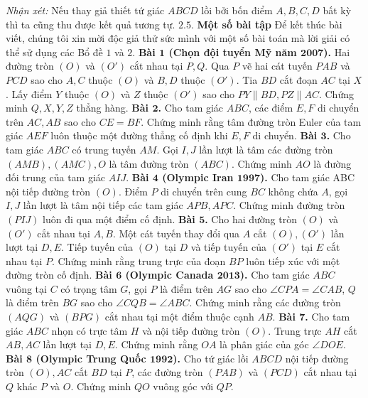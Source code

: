 \begin{multicols}{2}
\begin{figure}[H]
		\vspace*{-10pt}
	\end{figure}
	\textit{Nhận xét:} Nếu thay giả thiết tứ giác $ABCD$ lồi bởi bốn điểm $A,B,C,D$ bất kỳ thì ta cũng thu được kết quả tương tự.
	\vskip 0.1cm
	$\pmb{2.5.}$ \textbf{\color{hoccungpi}Một số bài tập}
	\vskip 0.1cm
	Để kết thúc bài viết, chúng tôi xin mời độc giả thử sức mình với một số bài toán mà lời giải có thể sử dụng các Bổ đề $1$ và $2$.
	\vskip 0.1cm
	\textbf{\color{hoccungpi}Bài $\pmb{1}$ (Chọn đội tuyển Mỹ năm $\pmb{2007}$).} Hai đường tròn $(O)$ và $(O')$ cắt nhau tại $P,Q$.  Qua $P$ vẽ hai cát tuyến $PAB$ và $PCD$ sao cho $A,C$ thuộc $(O)$ và $B,D$ thuộc $(O')$. Tia $BD$ cắt đoạn $AC$ tại $X$. Lấy điểm $Y$ thuộc $(O)$ và $Z$ thuộc $(O')$ sao cho $PY\parallel BD,PZ\parallel AC$. Chứng minh $Q,X,Y,Z$ thẳng hàng.
	\vskip 0.1cm
	\textbf{\color{hoccungpi}Bài $\pmb{2}$.} Cho tam giác $ABC$, các điểm $E,F$ di chuyển trên $AC,AB$ sao cho $CE=BF$. Chứng minh rằng tâm đường tròn Euler của tam giác $AEF$ luôn thuộc một đường thẳng cố định khi $E,F$ di chuyển.
	\vskip 0.1cm
	\textbf{\color{hoccungpi}Bài $\pmb{3}$.} Cho tam giác $ABC$ có trung tuyến $AM$. Gọi $I,J$ lần lượt là tâm các đường tròn $(AMB),(AMC),O$ là tâm đường tròn $(ABC)$. Chứng minh $AO$ là đường đối trung của tam giác $AIJ$.
	\vskip 0.1cm
	\textbf{\color{hoccungpi}Bài $\pmb{4}$ (Olympic Iran $\pmb{1997}$).} Cho tam giác ABC nội tiếp đường tròn $(O)$. Điểm $P$ di chuyển trên cung $BC$ không chứa $A$, gọi $I,J$ lần lượt là tâm nội tiếp các tam giác $APB,APC$. Chứng minh đường tròn $(PIJ)$ luôn đi qua một điểm cố định.
	\vskip 0.1cm
	\textbf{\color{hoccungpi}Bài $\pmb{5}$.} Cho hai đường tròn $(O)$ và $(O')$ cắt nhau  tại $A,B$. Một cát tuyến thay đổi qua $A$ cắt $(O),(O')$ lần lượt tại $D,E$. Tiếp tuyến của $(O)$ tại $D$ và tiếp tuyến của $(O')$ tại $E$ cắt nhau tại $P$. Chứng minh rằng trung trực của đoạn $BP$ luôn tiếp xúc với một đường tròn cố định.
	\vskip 0.1cm
	\textbf{\color{hoccungpi}Bài $\pmb{6}$ (Olympic Canada $\pmb{2013}$).} Cho tam giác $ABC$ vuông tại $C$ có trọng tâm $G$, gọi $P$ là điểm trên $AG$ sao cho  $\angle CPA = \angle CAB$, $Q$ là điểm trên $BG$ sao cho  $\angle CQB = \angle ABC$. Chứng minh rằng các đường tròn $(AQG)$ và $(BPG)$ cắt nhau tại một điểm thuộc cạnh $AB$.
	\vskip 0.1cm
	\textbf{\color{hoccungpi}Bài $\pmb{7}$.} Cho tam giác $ABC$ nhọn có trực tâm $H$ và nội tiếp đường tròn $(O)$. Trung trực $AH$ cắt $AB,AC$ lần lượt tại $D,E$. Chứng minh rằng $OA$ là phân giác của góc  $\angle DOE$.
	\vskip 0.1cm
	\textbf{\color{hoccungpi}Bài $\pmb{8}$ (Olympic Trung Quốc $\pmb{1992}$).} Cho tứ giác lồi $ABCD$ nội tiếp đường tròn $(O),AC$ cắt $BD$ tại $P$, các đường tròn $(PAB)$ và $(PCD)$ cắt nhau tại $Q$ khác $P$ và $O$. Chứng minh $QO$ vuông góc với $QP$.

\end{multicols}
